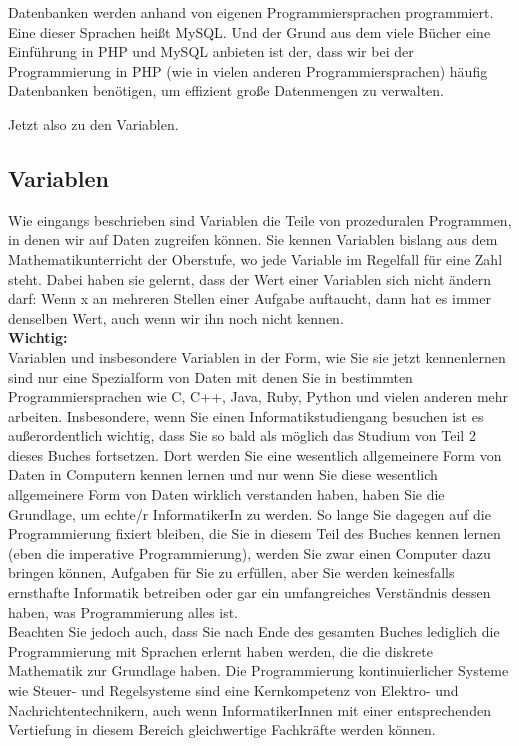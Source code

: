 \begin{itemize}
	Datenbanken werden anhand von eigenen Programmiersprachen programmiert. Eine dieser Sprachen heißt MySQL. Und der Grund aus dem viele Bücher eine Einführung in PHP und MySQL anbieten ist der, dass wir bei der Programmierung in PHP (wie in vielen anderen Programmiersprachen) häufig Datenbanken benötigen, um effizient große Datenmengen zu verwalten.
\end{itemize}

Jetzt also zu den Variablen.

\subsection{Variablen}

Wie eingangs beschrieben sind Variablen die Teile von prozeduralen Programmen, in denen wir auf Daten zugreifen können. Sie kennen Variablen bislang aus dem Mathematikunterricht der Oberstufe, wo jede Variable im Regelfall für eine Zahl steht. Dabei haben sie gelernt, dass der Wert einer Variablen sich nicht ändern darf: Wenn x an mehreren Stellen einer Aufgabe auftaucht, dann hat es immer denselben Wert, auch wenn wir ihn noch nicht kennen.\\

\textbf{Wichtig:} \\

Variablen und insbesondere Variablen in der Form, wie Sie sie jetzt kennenlernen sind nur eine Spezialform von Daten mit denen Sie in bestimmten Programmiersprachen wie C, C++, Java, Ruby, Python und vielen anderen mehr arbeiten. Insbesondere, wenn Sie einen Informatikstudiengang besuchen ist es außerordentlich wichtig, dass Sie so bald als möglich das Studium von Teil 2 dieses Buches fortsetzen. Dort werden Sie eine wesentlich allgemeinere Form von Daten in Computern kennen lernen und nur wenn Sie diese wesentlich allgemeinere Form von Daten wirklich verstanden haben, haben Sie die Grundlage, um \glqq{}echte/r\grqq{} InformatikerIn zu werden. So lange Sie dagegen auf die Programmierung fixiert bleiben, die Sie in diesem Teil des Buches kennen lernen (eben die imperative Programmierung), werden Sie zwar einen Computer dazu bringen können, Aufgaben für Sie zu erfüllen, aber Sie werden keinesfalls ernsthafte Informatik betreiben oder gar ein umfangreiches Verständnis dessen haben, was Programmierung alles ist.\\

Beachten Sie jedoch auch, dass Sie nach Ende des gesamten Buches lediglich die Programmierung mit Sprachen erlernt haben werden, die die diskrete Mathematik zur Grundlage haben. Die Programmierung kontinuierlicher Systeme wie Steuer- und Regelsysteme sind eine Kernkompetenz von Elektro- und Nachrichtentechnikern, auch wenn InformatikerInnen mit einer entsprechenden Vertiefung in diesem Bereich gleichwertige Fachkräfte werden können.

